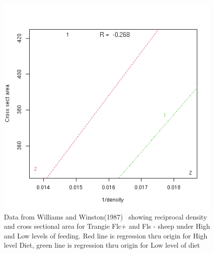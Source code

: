 %

\begin{figure}[h]
  \centering
   \includegraphics[width=1.1\textwidth]{WW1987/ww.png}
	\caption{Data from Williams and Winston(1987)~\cite{will:87} showing reciprocal density and cross sectional area for Trangie Flc+ and Fls - sheep under High and Low levels of feeding. Red line is regression thru origin for High level Diet, green line is regression thru origin for Low level of diet}
  \label{fig:ww}
\end{figure}

%

